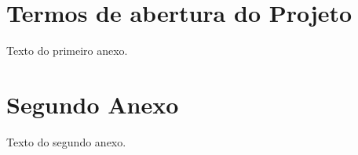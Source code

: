 \begin{anexosenv}

\partanexos

\chapter{Termos de abertura do Projeto}


Texto do primeiro anexo.

\chapter{Segundo Anexo}

Texto do segundo anexo.

\end{anexosenv}
